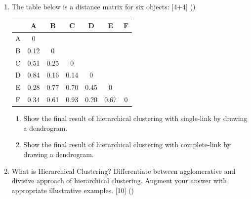 \documentclass[12pt]{article}
\begin{document}
\begin{enumerate}[topsep=0pt, noitemsep]
      \item The table below is a distance matrix for six objects: \hfill [4+4] ()\\
        \small
        \begin{tabular}{|c|c|c|c|c|c|c|}
          \hline
           & A & B & C & D & E & F \\ \hline
          A & 0 & & & & & \\ \hline
          B & 0.12 & 0 & & & & \\ \hline
          C & 0.51 & 0.25 & 0 & & & \\ \hline
          D & 0.84 & 0.16 & 0.14 & 0 & & \\ \hline
          E & 0.28 & 0.77 & 0.70 & 0.45 & 0 & \\ \hline
          F & 0.34 & 0.61 & 0.93 & 0.20 & 0.67 & 0 \\ \hline
        \end{tabular}
        \normalsize
        \begin{enumerate}[label=(\alph*),topsep=2pt,noitemsep]
          \item Show the final result of hierarchical clustering with single-link by drawing a dendrogram.
          \item Show the final result of hierarchical clustering with complete-link by drawing a dendrogram.
        \end{enumerate}

      \item What is Hierarchical Clustering? Differentiate between agglomerative and divisive approach of hierarchical clustering. Augment your answer with appropriate illustrative examples. \hfill [10] ()
    \end{enumerate}
\end{document}
